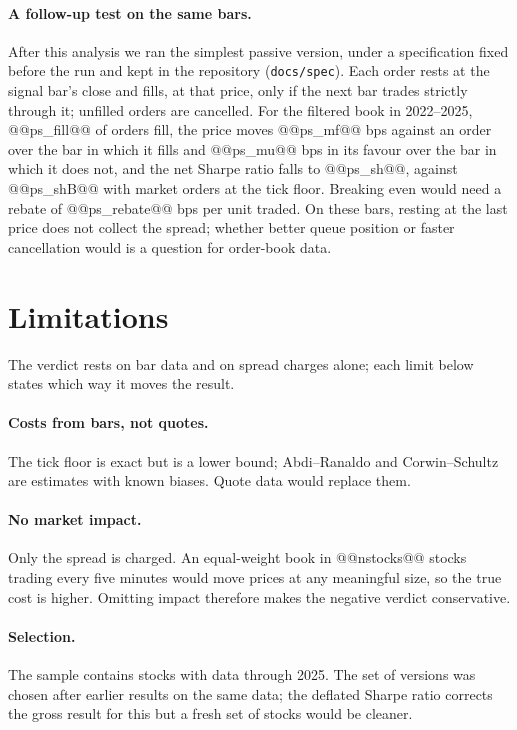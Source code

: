 \documentclass[11pt,a4paper]{article}
\begin{document}
\paragraph{A follow-up test on the same bars.} After this analysis we ran the simplest passive version,
under a specification fixed before the run and kept in the repository (\texttt{docs/spec}).
Each order rests at the signal bar's close and fills, at that price, only if the next bar trades strictly
through it; unfilled orders are cancelled. For the filtered book in 2022--2025, @@ps_fill@@ of orders fill,
the price moves @@ps_mf@@ bps against an order over the bar in which it fills and @@ps_mu@@ bps in its
favour over the bar in which it does not, and the net Sharpe ratio falls to @@ps_sh@@, against @@ps_shB@@
with market orders at the tick floor. Breaking even would need a rebate of @@ps_rebate@@ bps per unit
traded. On these bars, resting at the last price does not collect the spread; whether better queue
position or faster cancellation would is a question for order-book data.

\section{Limitations}
\label{sec:limits}

The verdict rests on bar data and on spread charges alone; each limit below states which way it moves the result.


\paragraph{Costs from bars, not quotes.} The tick floor is exact but is a lower bound; Abdi--Ranaldo and
Corwin--Schultz are estimates with known biases. Quote data would replace them.

\paragraph{No market impact.} Only the spread is charged. An equal-weight book in @@nstocks@@ stocks
trading every five minutes would move prices at any meaningful size, so the true cost is higher. Omitting impact therefore makes the negative verdict conservative.

\paragraph{Selection.} The sample contains stocks with data through 2025. The set of versions was chosen
after earlier results on the same data; the deflated Sharpe ratio corrects the gross result for this but a
fresh set of stocks would be cleaner.
\end{document}
